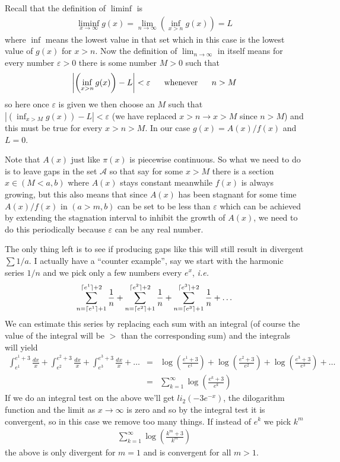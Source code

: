 \documentclass[aps,preprint,preprintnumbers,nofootinbib,showpacs,prd]{revtex4-1}
\newcommand{\ie}{{\it i.e.} }
\newcommand{\nbea}{\begin{eqnarray*}}
\newcommand{\neea}{\end{eqnarray*}}
\DeclarePairedDelimiter{\ceil}{\lceil}{\rceil}
\begin{document}
Recall that the definition of $\liminf$ is
%
\nbea
\liminf_{x\to\infty} g(x) = \lim_{n\to\infty}\left(\inf_{x>n} g(x)\right) = L
\neea
%
where $\inf$ means the lowest value in that set which in this case is the lowest value of $g(x)$ for $x > n$. Now the definition of $\lim_{n\to\infty}$ in itself means for every number $\varepsilon > 0$ there is some number $M > 0$ such that
%
\nbea
\left|\left(\inf_{x>n} g(x)\right) - L\right| < \varepsilon ~~~~~ {\rm whenever} ~~~~~ n > M
\neea
%
so here once $\varepsilon$ is given we then choose an $M$ such that $\left|\left(\inf_{x>M} g(x)\right) - L\right| < \varepsilon$ (we have replaced $x>n \to x>M$ since $n > M$) and this must be true for every $x > n > M$. In our case $g(x) = A(x)/f(x)$ and $L = 0$.

Note that $A(x)$ just like $\pi(x)$ is piecewise continuous. So what we need to do is to leave gaps in the set $\mathcal{A}$ so that say for some $x > M$ there is a section $x\in(M<a,b)$ where $A(x)$ stays constant meanwhile $f(x)$ is always growing, but this also means that since $A(x)$ has been stagnant for some time $A(x)/f(x)$ in $(a>m,b)$ can be set to be less than $\varepsilon$ which can be achieved by extending the stagnation interval to inhibit the growth of $A(x)$, we need to do this periodically because $\varepsilon$ can be any real number.

The only thing left is to see if producing gaps like this will still result in divergent $\sum 1/a$. I actually have a ``counter example'', say we start with the harmonic series $1/n$ and we pick only a few numbers every $e^x$, \ie 
%
\nbea
\sum_{n=\ceil{e^1}+1}^{\ceil{e^1}+2} \frac{1}{n} + \sum_{n=\ceil{e^2}+1}^{\ceil{e^2}+2} \frac{1}{n} + \sum_{n=\ceil{e^3}+1}^{\ceil{e^3}+2}\frac{1}{n} + \dots
\neea
%
We can estimate this series by replacing each sum with an integral (of course the value of the integral will be $>$ than the corresponding sum) and the integrals will yield
%
\nbea
\int_{e^1}^{e^1+3} \frac{dx}{x} + \int_{e^2}^{e^2+3} \frac{dx}{x} + \int_{e^3}^{e^3+3} \frac{dx}{x} + \dots & = & \log\left(\frac{e^1 + 3}{e^1}\right) + \log\left(\frac{e^2 + 3}{e^2}\right) + \log\left(\frac{e^3 + 3}{e^3}\right) + \dots \\
& = & \sum_{k = 1}^{\infty} \log \left(\frac{e^k+3}{e^k}\right)
\neea
%
If we do an integral test on the above we'll get ${{\mathit{li}}_{2}}\left(-3{{e}^{-x}}\right)$, the dilogarithm function and the limit as $x\to\infty$ is zero and so by the integral test it is convergent, so in this case we remove too many things. If instead of $e^k$ we pick $k^m$
%
\nbea
\sum_{k = 1}^{\infty} \log \left(\frac{k^{m}+3}{k^{m}}\right)
\neea
%
the above is only divergent for $m=1$ and is convergent for all $m > 1$.
\end{document}
